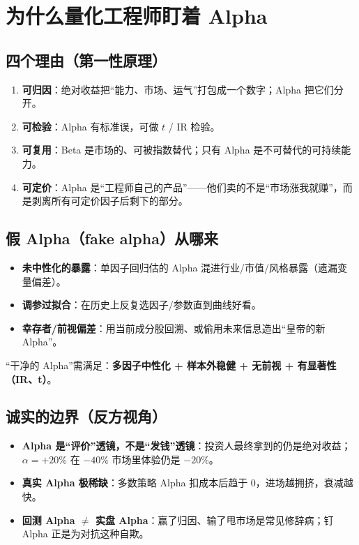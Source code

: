 \documentclass[UTF8,11pt]{ctexart}
\begin{document}
\section{为什么量化工程师盯着 Alpha}

\subsection{四个理由（第一性原理）}
\begin{enumerate}[itemsep=2pt]
\item \textbf{可归因}：绝对收益把“能力、市场、运气”打包成一个数字；Alpha 把它们分开。
\item \textbf{可检验}：Alpha 有标准误，可做 $t$ / IR 检验。
\item \textbf{可复用}：Beta 是市场的、可被指数替代；只有 Alpha 是不可替代的可持续能力。
\item \textbf{可定价}：Alpha 是“工程师自己的产品”——他们卖的不是“市场涨我就赚”，而是剥离所有可定价因子后剩下的部分。
\end{enumerate}

\subsection{假 Alpha（fake alpha）从哪来}
\begin{itemize}[itemsep=2pt]
\item \textbf{未中性化的暴露}：单因子回归估的 Alpha 混进行业/市值/风格暴露（遗漏变量偏差）。
\item \textbf{调参过拟合}：在历史上反复选因子/参数直到曲线好看。
\item \textbf{幸存者/前视偏差}：用当前成分股回溯、或偷用未来信息造出“皇帝的新 Alpha”。
\end{itemize}
“干净的 Alpha”需满足：\textbf{多因子中性化 + 样本外稳健 + 无前视 + 有显著性（IR、t）}。

\subsection{诚实的边界（反方视角）}
\begin{itemize}[itemsep=2pt]
\item \textbf{Alpha 是“评价”透镜，不是“发钱”透镜}：投资人最终拿到的仍是绝对收益；$\alpha=+20\%$ 在 $-40\%$ 市场里体验仍是 $-20\%$。
\item \textbf{真实 Alpha 极稀缺}：多数策略 Alpha 扣成本后趋于 0，进场越拥挤，衰减越快。
\item \textbf{回测 Alpha $\neq$ 实盘 Alpha}：赢了归因、输了甩市场是常见修辞病；钉 Alpha 正是为对抗这种自欺。
\end{itemize}
\end{document}
